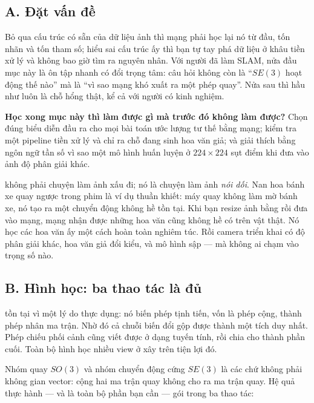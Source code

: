 \documentclass[../../../deep_learning.tex]{subfiles}
\begin{document}
\subsection{A. Đặt vấn đề}
Bỏ qua cấu trúc có sẵn của dữ liệu ảnh thì mạng phải học lại nó từ đầu, tốn nhãn và tốn tham số; hiểu sai cấu trúc ấy thì bạn tự tay phá dữ liệu ở khâu tiền xử lý và không bao giờ tìm ra nguyên nhân. Với người đã làm SLAM, nửa đầu mục này là ôn tập nhanh có đổi trọng tâm: câu hỏi không còn là ``\(SE(3)\) hoạt động thế nào'' mà là ``vì sao mạng khó xuất ra một phép quay''. Nửa sau thì hầu như luôn là chỗ hổng thật, kể cả với người có kinh nghiệm.

\textbf{Học xong mục này thì làm được gì mà trước đó không làm được?} Chọn đúng biểu diễn đầu ra cho mọi bài toán ước lượng tư thế bằng mạng; kiểm tra một pipeline tiền xử lý và chỉ ra chỗ đang sinh hoa văn giả; và giải thích bằng ngôn ngữ tần số vì sao một mô hình huấn luyện ở \(224\times224\) sụt điểm khi đưa vào ảnh độ phân giải khác.

\begin{trucgiac}
 không phải chuyện làm ảnh xấu đi; nó là chuyện làm ảnh \emph{nói dối}. Nan hoa bánh xe quay ngược trong phim là ví dụ thuần khiết: máy quay không làm mờ bánh xe, nó tạo ra một chuyển động không hề tồn tại. Khi bạn resize ảnh bằng  rồi đưa vào mạng, mạng nhận được những hoa văn cũng không hề có trên vật thật. Nó học các hoa văn ấy một cách hoàn toàn nghiêm túc. Rồi camera triển khai có độ phân giải khác, hoa văn giả đổi kiểu, và mô hình sập --- mà không ai chạm vào trọng số nào.
\end{trucgiac}

\subsection{B. Hình học: ba thao tác là đủ}
 tồn tại vì một lý do thực dụng: nó biến phép tịnh tiến, vốn là phép cộng, thành phép nhân ma trận. Nhờ đó cả chuỗi biến đổi gộp được thành một tích duy nhất. Phép chiếu phối cảnh cũng viết được ở dạng tuyến tính, rồi chia cho thành phần cuối. Toàn bộ hình học nhiều view ở  xây trên tiện lợi đó.

Nhóm quay \(SO(3)\) và nhóm chuyển động cứng \(SE(3)\) là các  chứ không phải không gian vector: cộng hai ma trận quay không cho ra ma trận quay. Hệ quả thực hành --- và là toàn bộ phần  bạn cần --- gói trong ba thao tác:
\end{document}
